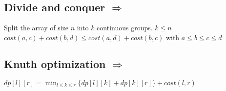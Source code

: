 \subsection{Divide and conquer  $\Rightarrow$ } 
Split the array of size $n$ into $k$ continuous groups. $k \leq n$ \\
$ cost(a, c) + cost(b, d) \leq cost(a, d) + cost(b, c)$ with $a \leq b \leq c \leq d$ \\

\subsection{Knuth optimization  $\Rightarrow$ } 
$ dp[l][r] = \min_{l \leq k \leq r}\{dp[l][k] + dp[k][r]\} + cost(l, r)$ \\
